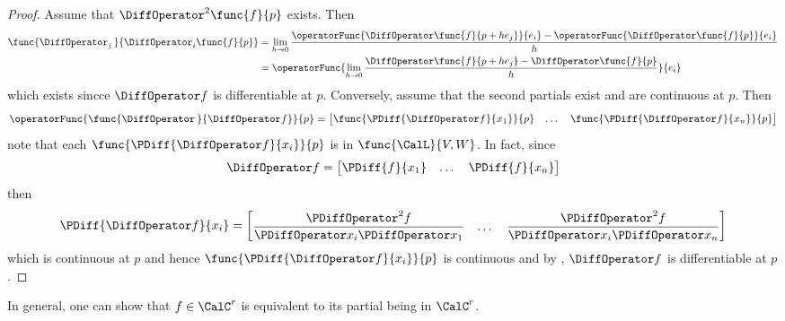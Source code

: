 \begin{proof}
    Assume that \(\DiffOperator^2 \func{f}{p}\) exists. Then
    \begin{align*}
        \func{\DiffOperator_j \,}{\DiffOperator_i \func{f}{p}} & = \lim_{h \to 0} \dfrac{\operatorFunc{\DiffOperator \func{f}{p + he_j}}{e_i} - \operatorFunc{\DiffOperator \func{f}{p}}{e_i} }{h} \\
                                                               & = \operatorFunc{ \lim_{h \to 0} \dfrac{\DiffOperator \func{f}{p + he_j} - \DiffOperator \func{f}{p}}{h} }{e_i}
    \end{align*}
    which exists sincce \(\DiffOperator f\) is differentiable at \(p\). Conversely, assume that the second partials exist and are continuous at \(p\). Then
    \begin{equation*}
        \operatorFunc{\func{\DiffOperator \,}{\DiffOperator f}}{p} = \begin{bmatrix}
            \func{\PDiff{\DiffOperator f}{x_1}}{p} & \dots & \func{\PDiff{\DiffOperator f}{x_n}}{p}
        \end{bmatrix}
    \end{equation*}
    note that each \(\func{\PDiff{\DiffOperator f}{x_i}}{p}\) is in \(\func{\CalL}{V,W}\). In fact, since
    \begin{equation*}
        \DiffOperator f = \begin{bmatrix}
            \PDiff{f}{x_1} & \dots & \PDiff{f}{x_n}
        \end{bmatrix}
    \end{equation*}
    then
    \begin{equation*}
        \PDiff{\DiffOperator f}{x_i} =  \begin{bmatrix}
            \dfrac{\PDiffOperator^2 f}{\PDiffOperator x_i \PDiffOperator x_1} & \dots & \dfrac{\PDiffOperator^2 f}{\PDiffOperator x_i \PDiffOperator x_n}
        \end{bmatrix}
    \end{equation*}
    which is continuous at \(p\) and hence \(\func{\PDiff{\DiffOperator f}{x_i}}{p}\) is continuous and by , \(\DiffOperator f\) is differentiable at \(p\).
\end{proof}

In general, one can show that \(f \in \CalC^r\) is equivalent to its partial being in \(\CalC^r\).

